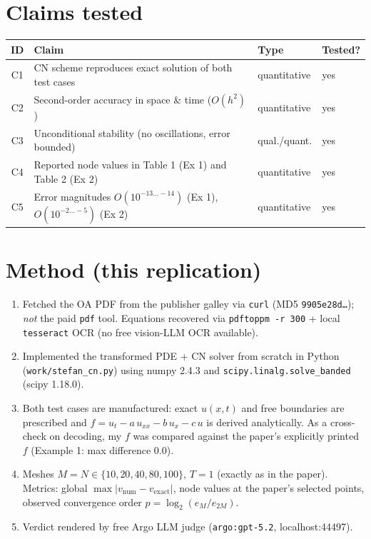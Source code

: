 \documentclass[11pt]{article}
\begin{document}
\section{Claims tested}
\begin{center}
\begin{tabular}{clll}
\toprule
ID & Claim & Type & Tested? \\
\midrule
C1 & CN scheme reproduces exact solution of both test cases & quantitative & yes \\
C2 & Second-order accuracy in space \& time ($O(h^{2})$) & quantitative & yes \\
C3 & Unconditional stability (no oscillations, error bounded) & qual./quant. & yes \\
C4 & Reported node values in Table 1 (Ex 1) and Table 2 (Ex 2) & quantitative & yes \\
C5 & Error magnitudes $O(10^{-13\ldots-14})$ (Ex 1), $O(10^{-2\ldots-5})$ (Ex 2) & quantitative & yes \\
\bottomrule
\end{tabular}
\end{center}

\section{Method (this replication)}
\begin{enumerate}
  \item Fetched the OA PDF from the publisher galley via \texttt{curl}
        (MD5 \texttt{9905e28d\ldots}); \emph{not} the paid \texttt{pdf} tool.
        Equations recovered via \texttt{pdftoppm -r 300} + local
        \texttt{tesseract} OCR (no free vision-LLM OCR available).
  \item Implemented the transformed PDE + CN solver from scratch in Python
        (\texttt{work/stefan\_cn.py}) using numpy 2.4.3 and
        \texttt{scipy.linalg.solve\_banded} (scipy 1.18.0).
  \item Both test cases are manufactured: exact $u(x,t)$ and free boundaries are
        prescribed and $f = u_t - a\,u_{xx} - b\,u_x - c\,u$ is derived
        analytically. As a cross-check on decoding, my $f$ was compared against
        the paper's explicitly printed $f$ (Example 1: max difference $0.0$).
  \item Meshes $M=N\in\{10,20,40,80,100\}$, $T=1$ (exactly as in the paper).
        Metrics: global $\max\lvert v_{\text{num}}-v_{\text{exact}}\rvert$, node
        values at the paper's selected points, observed convergence order
        $p=\log_2(e_M/e_{2M})$.
  \item Verdict rendered by free Argo LLM judge
        (\texttt{argo:gpt-5.2}, localhost:44497).
\end{enumerate}
\end{document}
